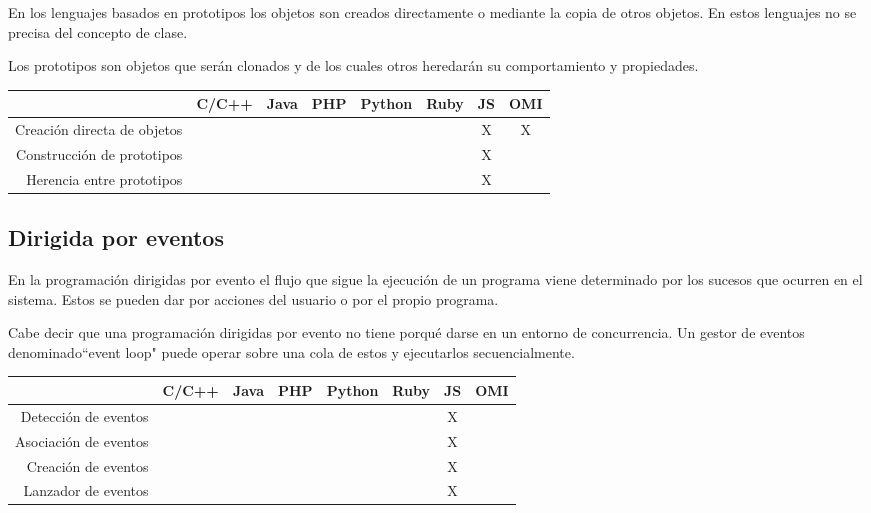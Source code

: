En los lenguajes basados en prototipos los objetos son creados directamente o mediante
la copia de otros objetos. En estos lenguajes no se precisa del concepto de clase.

Los prototipos son objetos que serán clonados y de los cuales otros heredarán su
comportamiento y propiedades.

\FloatBarrier
\begin{table}[h]
\begin{center}
 
\begin{tabular}{|r|c|c|c|c|c|c|c|} \hline
 & C/C++ & Java &  PHP  & Python & Ruby & JS & OMI\\ \hline
Creación directa de objetos &  & &  &  &  & X & X \\ \hline
Construcción de prototipos &  & &  &  &  & X &  \\ \hline
Herencia entre prototipos &  & &  &  &  & X &  \\ \hline
\end{tabular}
\end{center}
\end{table}
\FloatBarrier

\subsection{Dirigida por eventos}
En la programación dirigidas por evento el flujo que sigue la ejecución de un programa viene 
determinado por los sucesos que ocurren en el sistema. Estos se pueden dar por acciones del usuario
o por el propio programa.

Cabe decir que una programación dirigidas por evento no tiene porqué darse en un 
entorno de concurrencia. Un gestor de eventos denominado``event loop" puede operar sobre 
una cola de estos y ejecutarlos secuencialmente.

\FloatBarrier
\begin{table}[h]
\begin{center}
 
\begin{tabular}{|r|c|c|c|c|c|c|c|} \hline
 & C/C++ & Java & PHP  & Python & Ruby & JS & OMI\\ \hline
Detección de eventos & & & & & & X &  \\ \hline
Asociación de eventos & & & & & & X &  \\ \hline  
Creación de eventos & & & & & & X &  \\ \hline  
Lanzador de eventos & & & & & & X &  \\ \hline  
\end{tabular}
\end{center}
\end{table}
\FloatBarrier

